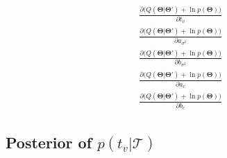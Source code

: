 \documentclass{article}
\begin{document}
	\begin{eqnarray}
	\frac{\partial \big( Q(\boldsymbol{\Theta}|\boldsymbol{\Theta}') + \ln{p(\boldsymbol{\Theta})} \big)}{\partial t_v} \\
	\frac{\partial \big( Q(\boldsymbol{\Theta}|\boldsymbol{\Theta}') + \ln{p(\boldsymbol{\Theta})} \big)}{\partial a_{\sigma^2}} \\
	\frac{\partial \big( Q(\boldsymbol{\Theta}|\boldsymbol{\Theta}') + \ln{p(\boldsymbol{\Theta})} \big)}{\partial b_{\sigma^2}} \\
	\frac{\partial \big( Q(\boldsymbol{\Theta}|\boldsymbol{\Theta}') + \ln{p(\boldsymbol{\Theta})} \big)}{\partial a_c} \\
	\frac{\partial \big( Q(\boldsymbol{\Theta}|\boldsymbol{\Theta}') + \ln{p(\boldsymbol{\Theta})} \big)}{\partial b_c}
	\end{eqnarray}

\subsection{Posterior of $p(t_v | \mathcal{T})$}	
	
\end{document}
